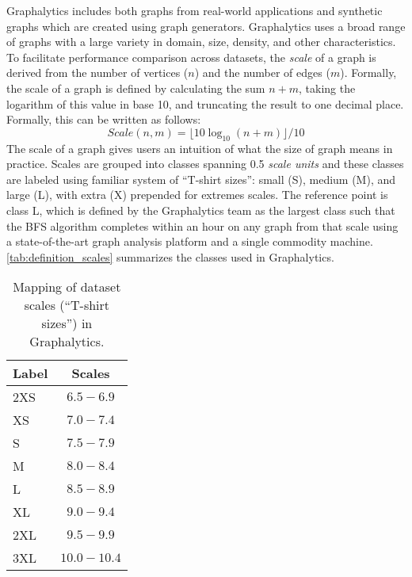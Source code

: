 Graphalytics includes both graphs from real-world applications and synthetic graphs which are created using graph generators. Graphalytics uses a broad range of graphs with a large variety in domain, size, density, and other characteristics. To facilitate performance comparison across datasets, the \emph{scale} of a graph is derived from the number of vertices ($n$) and the number of edges ($m$). Formally, the scale of a graph is defined by calculating the sum $n + m$, taking the logarithm of this value in base 10, and truncating the result to one decimal place. Formally, this can be written as follows:
%
\begin{equation}
\textit{Scale}(n, m) = \lfloor 10 \log_{10}(n + m) \rfloor / 10
\end{equation}
%
The scale of a graph gives users an intuition of what the size of graph means in practice. Scales are grouped into classes spanning 0.5 \emph{scale units} and these classes are labeled using familiar system of ``T-shirt sizes'': small (S), medium (M), and large (L), with extra (X) prepended for extremes scales. The reference point is class L, which is defined by the Graphalytics team as the largest class such that the BFS algorithm completes within an hour on any graph from that scale using a state-of-the-art graph analysis platform and a single commodity machine. \autoref{tab:definition_scales} summarizes the classes used in Graphalytics.


\begin{table}
\centering
\begin{tabular}{|l||c|}
\hline
\textbf{Label} & \textbf{Scales} \\ %
\hline \hline
2XS & $6.5 - 6.9$ %
\\ \hline
XS & $7.0 - 7.4$ %
\\ \hline
S & $7.5-7.9$ %
 \\ \hline
M & $8.0 - 8.4$ %
\\ \hline
L & $8.5 - 8.9$ %
\\ \hline
XL & $9.0 - 9.4$ %
 \\ \hline
2XL & $9.5 - 9.9$ %
\\ \hline
3XL & $10.0 - 10.4$ %
\\ \hline
\end{tabular}
\caption{Mapping of dataset scales (``T-shirt sizes'') in Graphalytics.}
\label{tab:definition_scales}
\end{table}


